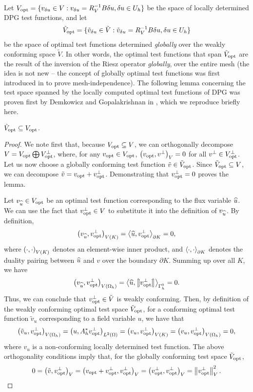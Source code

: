 Let $V_{\rm opt} = \{v_{\delta u} \in V: v_{\delta u}= R_V^{-1}B\delta u, \delta u \in U_h\}$ be the space of locally determined DPG test functions, and let 
\[
\tilde{V}_{\rm opt} = \{\tilde{v}_{\delta u} \in \tilde{V}: \tilde{v}_{\delta u} = R_{V}^{-1}B\delta u, \delta u \in U_h\}
\]
be the space of optimal test functions determined \textit{globally} over the weakly conforming space $\tilde{V}$.  In other words, the optimal test functions that span $\tilde{V}_{\rm opt}$ are the result of the inversion of the Riesz operator \textit{globally}, over the entire mesh (the idea is not new -- the concept of globally optimal test functions was first introduced in \cite{DPG3} to prove mesh-independence). The following lemma concerning the test space spanned by the locally computed optimal test functions of DPG was proven first by Demkowicz and Gopalakrishnan in \cite{overviewDPG}, which we reproduce briefly here.
\begin{lemma}
\label{lemma1}
$\tilde{V}_{\rm opt} \subseteq V_{\rm opt}$.
\end{lemma}
\begin{proof}
We note first that, because $V_{\rm opt} \subseteq V$, we can orthogonally decompose $V = V_{\rm opt} \bigoplus V_{\rm opt}^\perp$, where, for any $v_{\rm opt}\in V_{\rm opt}$, $\LRp{v_{\rm opt},v^\perp}_V = 0$ for all $v^\perp \in V_{\rm opt}^\perp$.  Let us now choose a globally conforming test function $\tilde{v}\in \tilde{V}_{\rm opt}$.  Since $\tilde{V}_{\rm opt} \subseteq V$, we can decompose $\tilde{v} = v_{\rm opt} + v_{\rm opt}^\perp$.  Demonstrating that $v_{\rm opt}^\perp = 0$ proves the lemma.  

Let $v_{\uh} \in V_{\rm opt}$ be an optimal test function corresponding to the flux variable $\uh$.  We can use the fact that $v_{\rm opt}^\perp \in V$ to substitute it into the definition of $v_{\uh}$.  By definition, 
\[
\LRp{v_{\uh},v_{\rm opt}^\perp}_{V(K)} = \LRa{\uh,v_{\rm opt}^\perp}_{\partial K} = 0,
\]
where $\LRp{\cdot,\cdot}_{V(K)}$ denotes an element-wise inner product, and $\LRa{\cdot,\cdot}_{\partial K}$ denotes the duality pairing between $\uh$ and $v$ over the boundary $\partial K$.  Summing up over all $K$, we have
\[
\LRp{v_{\uh},v_{\rm opt}^\perp}_{V(\Oh)} = \LRa{\uh,\jump{v_{\rm opt}^\perp}}_{\Gh^0} = 0.
\]
Thus, we can conclude that $v_{\rm opt}^\perp \in \tilde{V}$ is weakly conforming.  Then, by definition of the weakly conforming optimal test space $\tilde{V}_{\rm opt}$, for a conforming optimal test function $\tilde{v}_u$ corresponding to a field variable $u$, we have that
\[
\LRp{\tilde{v}_u,v_{\rm opt}^\perp}_{V(\Oh)} = \LRp{u,A^*_h v_{\rm opt}^\perp}_{L^2(\Omega)} = \LRp{v_u, v_{\rm opt}^\perp}_{V(K)} = \LRp{v_u, v_{\rm opt}^\perp}_{V(\Oh)} = 0,
\]
where $v_u$ is a non-conforming locally determined test function.  The above orthogonality conditions imply that, for the globally conforming test space $\tilde{V}_{\rm opt}$, 
\[
0 = \LRp{\tilde{v},v_{\rm opt}^\perp}_V = \LRp{v_{\rm opt} + v_{\rm opt}^\perp,v_{\rm opt}^\perp}_V = \LRp{v_{\rm opt}^\perp,v_{\rm opt}^\perp}_V = \nor{v_{\rm opt}^\perp}_V^2.
\]
\end{proof}


